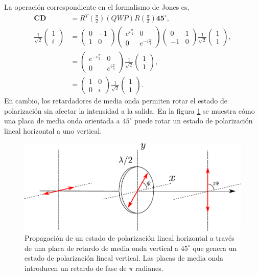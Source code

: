 La operación correspondiente en el formalismo de Jones es,
\begin{align*}
\mathbf{CD} &=
R^{T}\left(\frac{\pi}{2}\right)\left(QWP\right)R\left(\frac{\pi}{2}\right)\mathbf{45}^{\circ},\\ 
  \frac{1}{\sqrt{2}}
\begin{pmatrix}
1\\i
\end{pmatrix}&=
\begin{pmatrix}
  0 &-1\\1&0
\end{pmatrix}
\begin{pmatrix} e^{i\frac{\pi}{4}}  &0\\0&e^{-i\frac{\pi}{4}} \end{pmatrix}
\begin{pmatrix}
  0&1\\-1&0
\end{pmatrix}
 \frac{1}{\sqrt{2}}
\begin{pmatrix}
1\\ 1
\end{pmatrix},
\\
&=
\begin{pmatrix}
e^{-i\frac{\pi}{4}}  & 0 \\0 & e^{i\frac{\pi}{4}} 
\end{pmatrix}
  \frac{1}{\sqrt{2}}
\begin{pmatrix}
1\\ 1
\end{pmatrix},\\
&=
\begin{pmatrix}
1  & 0 \\0 & i
\end{pmatrix}
  \frac{1}{\sqrt{2}}
\begin{pmatrix}
1\\ 1
\end{pmatrix}.
\end{align*}
En cambio, los retardadores de media onda permiten rotar el estado de
polarización sin afectar la intensidad a la salida. En la
figura \ref{fig:hwp_retarder} se muestra cómo una placa de media onda
orientada a $45^{\circ}$ puede rotar un estado de polarización lineal
horizontal a uno vertical. 
\begin{figure}[h!]
\centering
\includegraphics[scale=.7]{HWP_retarder}
\caption[Generación de estados de polarización lineales]{Propagación de un estado de polarización lineal horizontal a través de una placa de retardo de media onda
  vertical a $45^{\circ}$ que genera un estado de polarización lineal vertical. Las
placas de media onda introducen un retardo de fase de
$\pi$ radianes.}
\label{fig:hwp_retarder}
\end{figure}
